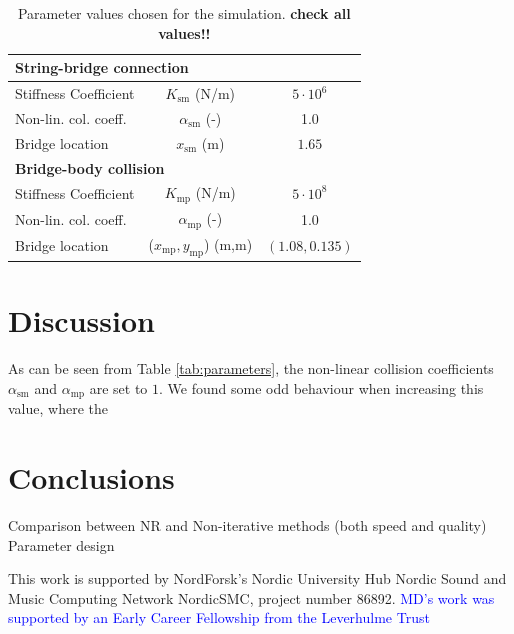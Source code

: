\documentclass[dvipsnames, pdftex]{article}
\def\MDcomment[#1]{\textcolor{Blue}{#1}}
\begin{document}
\begin{table}[t]
\begin{center}
\begin{tabular}{|l|c|c|}
    \multicolumn{3}{|l|}{\bf String-bridge connection}\\\hline
    Stiffness Coefficient & $K_\text{sm}$ (N/m) & $5\cdot10^{6}$\\
    Non-lin. col. coeff. &$\alpha_\text{sm}$ (-) & 1.0\\
    Bridge location & $x_\text{sm}$ (m)& $1.65$
    \\
    \hline
    \multicolumn{3}{|l|}{\bf Bridge-body collision}\\\hline
    Stiffness Coefficient & $K_\text{mp}$ (N/m) & $5\cdot10^{8}$\\
    Non-lin. col. coeff. &$\alpha_\text{mp}$ (-) & 1.0\\
    Bridge location & ($x_\text{mp},y_\text{mp}$) (m,m)& $(1.08,0.135)$\\
    \hline
\end{tabular}
\caption{Parameter values chosen for the simulation. \textbf{check all values!!}}
\end{center}
\end{table}
\section{Discussion}

As can be seen from Table \ref{tab:parameters}, the non-linear collision coefficients $\alpha_\text{sm}$ and $\alpha_\text{mp}$ are set to $1$. We found some odd behaviour when increasing this value, where the 
\section{Conclusions}
Comparison between NR and Non-iterative methods (both speed and quality) Parameter design
\begin{acknowledgments}
This work is supported by NordForsk's Nordic
University Hub Nordic Sound and Music Computing Network
NordicSMC, project number 86892. \MDcomment[MD's work was supported by an Early Career Fellowship from the Leverhulme Trust]{}
\end{acknowledgments} 


\end{document}
